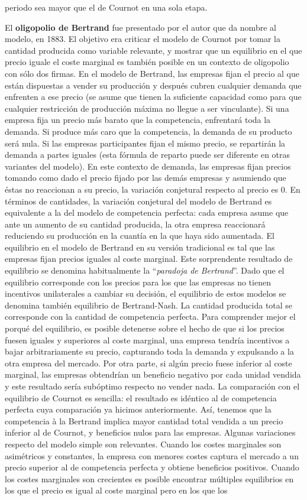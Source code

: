 \documentclass{nuevotema}
\begin{document}
periodo sea mayor que el de Cournot en una sola etapa.

El \textbf{oligopolio de Bertrand} fue presentado por el autor que da nombre al modelo, en 1883. El objetivo era criticar el modelo de Cournot por tomar la cantidad producida como variable relevante, y mostrar que un equilibrio en el que precio iguale el coste marginal es también posible en un contexto de oligopolio con sólo dos firmas. En el modelo de Bertrand, las empresas fijan el precio al que están dispuestas a vender su producción y después cubren cualquier demanda que enfrenten a ese precio (se asume que tienen la suficiente capacidad como para que cualquier restricción de producción máxima no llegue a ser vinculante). Si una empresa fija un precio más barato que la competencia, enfrentará toda la demanda. Si produce más caro que la competencia, la demanda de su producto será nula. Si las empresas participantes fijan el mismo precio, se repartirán la demanda a partes iguales (esta fórmula de reparto puede ser diferente en otras variantes del modelo). En este contexto de demanda, las empresas fijan precios tomando como dado el precio fijado por las demás empresas y asumiendo que éstas no reaccionan a su precio, la variación conjetural respecto al precio es 0. En términos de cantidades, la variación conjetural del modelo de Bertrand es equivalente a la del modelo de competencia perfecta: cada empresa asume que ante un aumento de su cantidad producida, la otra empresa reaccionará reduciendo su producción en la cuantía en la que haya sido aumentada. El equilibrio en el modelo de Bertrand en su versión tradicional es tal que las empresas fijan precios iguales al coste marginal. Este sorprendente resultado de equilibrio se denomina habitualmente la ``\textit{paradoja de Bertrand}''. Dado que el equilibrio corresponde con los precios para los que las empresas no tienen incentivos unilaterales a cambiar su decisión, el equilibrio de estos modelos se denomina también equilibrio de Bertrand-Nash. La cantidad producida total se corresponde con la cantidad de competencia perfecta. Para comprender mejor el porqué del equilibrio, es posible detenerse sobre el hecho de que si los precios fuesen iguales y superiores al coste marginal, una empresa tendría incentivos a bajar arbitrariamente su precio, capturando toda la demanda y expulsando a la otra empresa del mercado. Por otra parte, si algún precio fuese inferior al coste marginal, las empresas obtendrían un beneficio negativo por cada unidad vendida y este resultado sería subóptimo respecto no vender nada. La comparación con el equilibrio de Cournot es sencilla: el resultado es idéntico al de competencia perfecta cuya comparación ya hicimos anteriormente. Así, tenemos que la competencia à la Bertrand implica mayor cantidad total vendida a un precio inferior al de Cournot, y beneficios nulos para las empresas. Algunas variaciones respecto del modelo simple son relevantes. Cuando los costes marginales son asimétricos y constantes, la empresa con menores costes captura el mercado a un precio superior al de competencia perfecta y obtiene beneficios positivos. Cuando los costes marginales son crecientes es posible encontrar múltiples equilibrios en los que el precio es igual al coste marginal pero en los que los 
\end{document}
